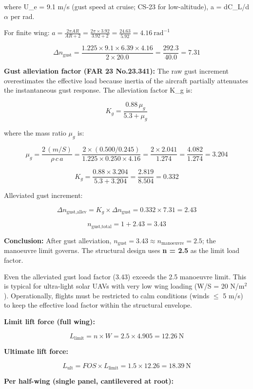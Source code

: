 \documentclass[10pt,a4paper]{article}
\begin{document}
where U\_e = 9.1 m/s (gust speed at cruise; CS-23 for low-altitude), a = dC\_L/d${\alpha}$ per rad.

For finite wing: $a = \frac{2\pi AR}{AR + 2} = \frac{2\pi \times 3.92}{3.92 + 2} = \frac{24.63}{5.92} = 4.16\ \text{rad}^{-1}$

\[
\Delta n_{\text{gust}} = \frac{1.225 \times 9.1 \times 6.39 \times 4.16}{2 \times 20.0} = \frac{292.3}{40.0} = 7.31
\]

\textbf{Gust alleviation factor (FAR 23 No.23.341):} The raw gust increment overestimates the effective load because inertia of the aircraft partially attenuates the instantaneous gust response. The alleviation factor K\_g is:

\[
K_g = \frac{0.88\,\mu_g}{5.3 + \mu_g}
\]

where the mass ratio $\mu_g$ is:

\[
\mu_g = \frac{2\,(m/S)}{\rho\,c\,a} = \frac{2 \times (0.500/0.245)}{1.225 \times 0.250 \times 4.16} = \frac{2 \times 2.041}{1.274} = \frac{4.082}{1.274} = 3.204
\]

\[
K_g = \frac{0.88 \times 3.204}{5.3 + 3.204} = \frac{2.819}{8.504} = 0.332
\]

Alleviated gust increment:

\[
\Delta n_{\text{gust,allev}} = K_g \times \Delta n_{\text{gust}} = 0.332 \times 7.31 = 2.43
\]

\[
n_{\text{gust,total}} = 1 + 2.43 = 3.43
\]

\textbf{Conclusion:} After gust alleviation, $n_{\text{gust}} = 3.43 \approx n_{\text{manoeuvre}} = 2.5$; the manoeuvre limit governs. The structural design uses \textbf{n = 2.5} as the limit load factor.

Even the alleviated gust load factor (3.43) exceeds the 2.5 manoeuvre limit. This is typical for ultra-light solar UAVs with very low wing loading (W/S = 20 N/m$^{2}$). Operationally, flights must be restricted to calm conditions (winds ${\leq}$ 5 m/s) to keep the effective load factor within the structural envelope.

\textbf{Limit lift force (full wing):}

\[
L_{\text{limit}} = n \times W = 2.5 \times 4.905 = 12.26\ \text{N}
\]

\textbf{Ultimate lift force:}

\[
L_{\text{ult}} = FOS \times L_{\text{limit}} = 1.5 \times 12.26 = 18.39\ \text{N}
\]

\textbf{Per half-wing (single panel, cantilevered at root):}
\end{document}
